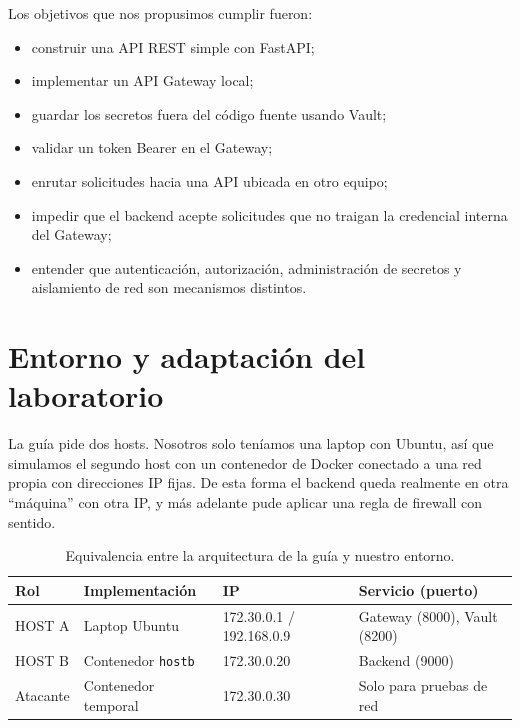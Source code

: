 \documentclass[11pt,a4paper]{article}
\begin{document}
Los objetivos que nos propusimos cumplir fueron:

\begin{itemize}[noitemsep]
  \item construir una API REST simple con FastAPI;
  \item implementar un API Gateway local;
  \item guardar los secretos fuera del código fuente usando Vault;
  \item validar un token Bearer en el Gateway;
  \item enrutar solicitudes hacia una API ubicada en otro equipo;
  \item impedir que el backend acepte solicitudes que no traigan la credencial interna del Gateway;
  \item entender que autenticación, autorización, administración de secretos y aislamiento de red son mecanismos distintos.
\end{itemize}

\section{Entorno y adaptación del laboratorio}

La guía pide dos hosts. Nosotros solo teníamos una laptop con Ubuntu, así que simulamos el segundo host con un contenedor de Docker conectado a una red propia con direcciones IP fijas. De esta forma el backend queda realmente en otra ``máquina'' con otra IP, y más adelante pude aplicar una regla de firewall con sentido.

\begin{table}[h]
\centering
\begin{tabular}{@{}llll@{}}
\toprule
\textbf{Rol} & \textbf{Implementación} & \textbf{IP} & \textbf{Servicio (puerto)} \\
\midrule
HOST A & Laptop Ubuntu & 172.30.0.1 / 192.168.0.9 & Gateway (8000), Vault (8200) \\
HOST B & Contenedor \texttt{hostb} & 172.30.0.20 & Backend (9000) \\
Atacante & Contenedor temporal & 172.30.0.30 & Solo para pruebas de red \\
\bottomrule
\end{tabular}
\caption{Equivalencia entre la arquitectura de la guía y nuestro entorno.}
\end{table}
\end{document}
